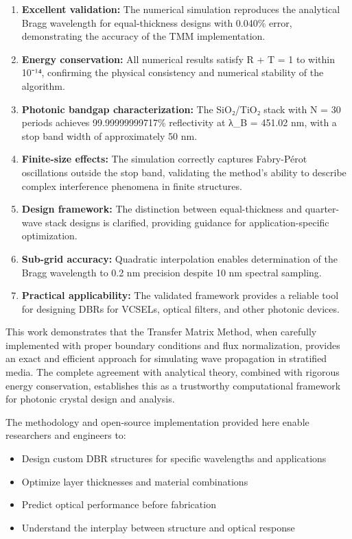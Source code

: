 \documentclass[
]{article}
\providecommand{\tightlist}{%
  \setlength{\itemsep}{0pt}\setlength{\parskip}{0pt}}
\begin{document}
\begin{enumerate}
\def\labelenumi{\arabic{enumi}.}
\item
  \textbf{Excellent validation:} The numerical simulation reproduces the
  analytical Bragg wavelength for equal-thickness designs with 0.040\%
  error, demonstrating the accuracy of the TMM implementation.
\item
  \textbf{Energy conservation:} All numerical results satisfy R + T = 1
  to within 10⁻¹⁴, confirming the physical consistency and numerical
  stability of the algorithm.
\item
  \textbf{Photonic bandgap characterization:} The SiO₂/TiO₂ stack with N
  = 30 periods achieves 99.99999999717\% reflectivity at λ\_B = 451.02
  nm, with a stop band width of approximately 50 nm.
\item
  \textbf{Finite-size effects:} The simulation correctly captures
  Fabry-Pérot oscillations outside the stop band, validating the
  method's ability to describe complex interference phenomena in finite
  structures.
\item
  \textbf{Design framework:} The distinction between equal-thickness and
  quarter-wave stack designs is clarified, providing guidance for
  application-specific optimization.
\item
  \textbf{Sub-grid accuracy:} Quadratic interpolation enables
  determination of the Bragg wavelength to 0.2 nm precision despite 10
  nm spectral sampling.
\item
  \textbf{Practical applicability:} The validated framework provides a
  reliable tool for designing DBRs for VCSELs, optical filters, and
  other photonic devices.
\end{enumerate}

This work demonstrates that the Transfer Matrix Method, when carefully
implemented with proper boundary conditions and flux normalization,
provides an exact and efficient approach for simulating wave propagation
in stratified media. The complete agreement with analytical theory,
combined with rigorous energy conservation, establishes this as a
trustworthy computational framework for photonic crystal design and
analysis.

The methodology and open-source implementation provided here enable
researchers and engineers to:

\begin{itemize}
\tightlist
\item
  Design custom DBR structures for specific wavelengths and applications
\item
  Optimize layer thicknesses and material combinations
\item
  Predict optical performance before fabrication
\item
  Understand the interplay between structure and optical response
\end{itemize}
\end{document}
